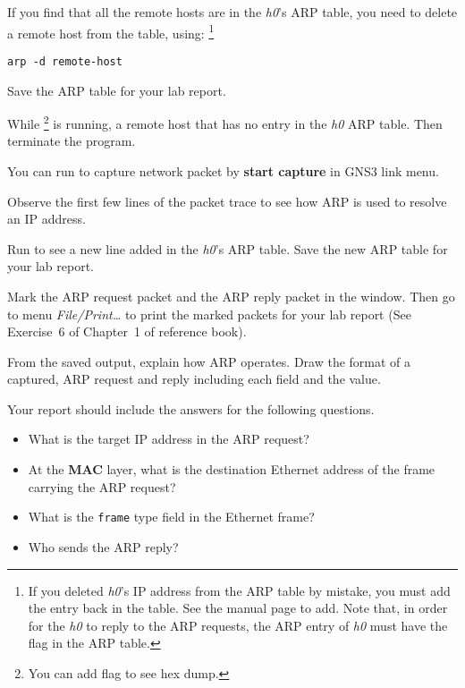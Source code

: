 \documentclass{../UTNetLab}
\begin{document}
If you find that all the remote hosts are in the \textit{h0}’s ARP table, you need to delete a remote host from the table, using:
\footnote{If you deleted \textit{h0}’s IP address from the ARP table by mistake, you must add the entry back in the table.
    See the  manual page to add.
    Note that, in order for the \textit{h0} to reply to the ARP requests, the ARP entry of \textit{h0} must have the  flag in the ARP table.}
\begin{lstlisting}[emph={remote-host}]
arp -d remote-host
    \end{lstlisting}

Save the ARP table for your lab report.

While \footnote{You can add  flag to see hex dump.} is running,  a remote host that has no entry in the \textit{h0} ARP table.
Then terminate the  program.

You can run  to capture network packet by \textbf{start capture} in GNS3 link menu.

Observe the first few lines of the packet trace to see how ARP is used to resolve an IP address.

Run  to see a new line added in the \textit{h0}’s ARP table.
Save the new ARP table for your lab report.

Mark the ARP request packet and the ARP reply packet in the  window.
Then go to menu \textit{File/Print\ldots} to print the marked packets for your lab report (See Exercise~6 of Chapter~1 of reference book).

\begin{report}
    \item From the saved  output, explain how ARP operates.
    Draw the format of a captured, ARP request and reply including each field and the value.
\end{report}

Your report should include the answers for the following questions.
\begin{itemize}
    \item What is the target IP address in the ARP request?
    \item At the \textbf{MAC} layer, what is the destination Ethernet address of the frame carrying the ARP request?
    \item What is the \texttt{frame} type field in the Ethernet frame?
    \item Who sends the ARP reply?
\end{itemize}
\end{document}
